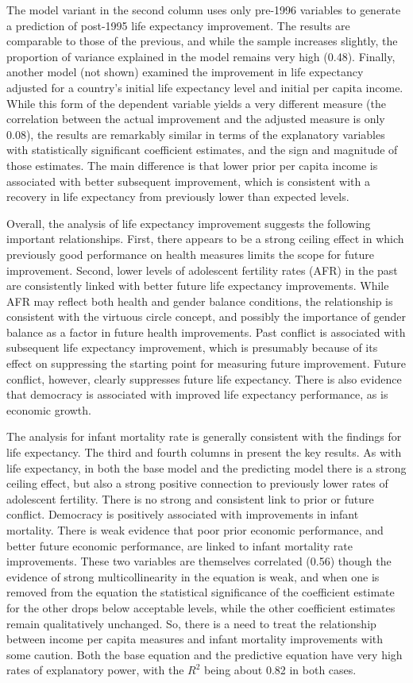 \documentclass[12pt]{article}
\begin{document}
The model variant in the second column uses only pre-1996 variables to generate a prediction of post-1995 life expectancy improvement. The results are comparable to those of the previous, and while the sample increases slightly, the proportion of variance explained in the model remains very high (0.48). Finally, another model (not shown) examined the improvement in life expectancy adjusted for a country's initial life expectancy level and initial per capita income. While this form of the dependent variable yields a very different measure (the correlation between the actual improvement and the adjusted measure is only 0.08), the results are remarkably similar in terms of the explanatory variables with statistically significant coefficient estimates, and the sign and magnitude of those estimates. The main difference is that lower prior per capita income is associated with better subsequent improvement, which is consistent with a recovery in life expectancy from previously lower than expected levels.

Overall, the analysis of life expectancy improvement suggests the following important relationships. First, there appears to be a strong ceiling effect in which previously good performance on health measures limits the scope for future improvement. Second, lower levels of adolescent fertility rates (AFR) in the past are consistently linked with better future life expectancy improvements. While AFR may reflect both health and gender balance conditions, the relationship is consistent with the virtuous circle concept, and possibly the importance of gender balance as a factor in future health improvements. Past conflict is associated with subsequent life expectancy improvement, which is presumably because of its effect on suppressing the starting point for measuring future improvement. Future conflict, however, clearly suppresses future life expectancy. There is also evidence that democracy is associated with improved life expectancy performance, as is economic growth.

The analysis for infant mortality rate is generally consistent with the findings for life expectancy. The third and fourth columns in  present the key results. As with life expectancy, in both the base model and the predicting model there is a strong ceiling effect, but also a strong positive connection to previously lower rates of adolescent fertility. There is no strong and consistent link to prior or future conflict. Democracy is positively associated with improvements in infant mortality. There is weak evidence that poor prior economic performance, and better future economic performance, are linked to infant mortality rate improvements. These two variables are themselves correlated (0.56) though the evidence of strong multicollinearity in the equation is weak, and when one is removed from the equation the statistical significance of the coefficient estimate for the other drops below acceptable levels, while the other coefficient estimates remain qualitatively unchanged. So, there is a need to treat the relationship between income per capita measures and infant mortality improvements with some caution. Both the base equation and the predictive equation have very high rates of explanatory power, with the $R^2$ being about 0.82 in both cases.
\end{document}
